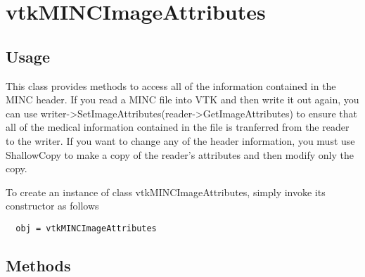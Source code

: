 \section{vtkMINCImageAttributes}

\subsection{Usage}

 This class provides methods to access all of the information
 contained in the MINC header.  If you read a MINC file into
 VTK and then write it out again, you can use 
 writer->SetImageAttributes(reader->GetImageAttributes) to
 ensure that all of the medical information contained in the
 file is tranferred from the reader to the writer.  If you
 want to change any of the header information, you must 
 use ShallowCopy to make a copy of the reader's attributes
 and then modify only the copy.

To create an instance of class vtkMINCImageAttributes, simply
invoke its constructor as follows
\begin{verbatim}
  obj = vtkMINCImageAttributes
\end{verbatim}
\subsection{Methods}

